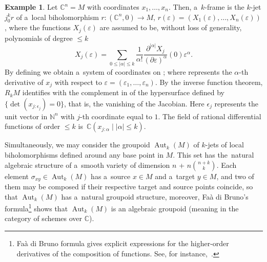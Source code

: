 \documentclass[pdftex]{sigma}
\numberwithin{equation}{section}
\theoremstyle{definition}
\newtheorem{Example}[Theorem]{Example}
\begin{document}
\begin{Example}\label{ex_1}
Let $\mathbb C^n = M$ with coordinates $x_1, \dots, x_n$. Then, a~$k$-frame is the $k$-jet $j_0^kr$ of a~local {biholomorphism} $r\colon(\mathbb C^n,0)\to M$, $r(\varepsilon) = (X_1(\varepsilon), \dots, X_n(\varepsilon))$, where the functions $X_j(\varepsilon)$ are assumed to be, without loss of generality, polynomials of {degree} $\leq k$
\[X_j(\varepsilon) = \sum_{0\leq|\alpha|\leq k}\frac{1}{\alpha!}\frac{\partial^{|\alpha|}X_j}{(\partial \varepsilon)^\alpha}(0)\varepsilon^\alpha.
\]
By defining 
we obtain a~system of  coordinates  on ; where  represents the $\alpha$-th derivative of $x_j$ with respect to
$\varepsilon = (\varepsilon_1,\dots,\varepsilon_n)$.
By the inverse function theorem, $R_kM$ identifies with the complement in  of the hypersurface defined by $\{\det\left( x_{j:\epsilon_j} \right)= 0\}$, that is, the vanishing of the Jacobian. Here $\epsilon_j$ represents the unit vector in $\mathbb N^n$ with $j$-th coordinate equal to $1$. The field of rational differential functions of order $\leq k$ is~${\mathbb C(x_{j:\alpha}\mid |\alpha|\leq k)}$.
\end{Example}

Simultaneously, we may consider the groupoid $\operatorname{Aut}_k(M)$ of $k$-jets of local biholomorphisms defined around any base point in $M$. This set has the~natural algebraic structure of a~smooth variety of dimension $n$ + $n\binom{n+k}{k}$. Each element $\sigma_{xy}\in \operatorname{Aut}_k(M)$ has a~source $x\in M$ and a~target $y\in M$, and two of them may be composed if their respective target and source points coincide, so that $\operatorname{Aut}_k(M)$ has a~natural groupoid structure, moreover, Fa\`a di Bruno's formula\footnote{Fa\`a di Bruno formula gives explicit expressions for the higher-order derivatives of the composition of functions. See, for instance,~\cite{weisstein2003faa}.} shows that $\operatorname{Aut}_k(M)$ is an algebraic groupoid (meaning in the category of schemes over $\mathbb C$).
\end{document}
